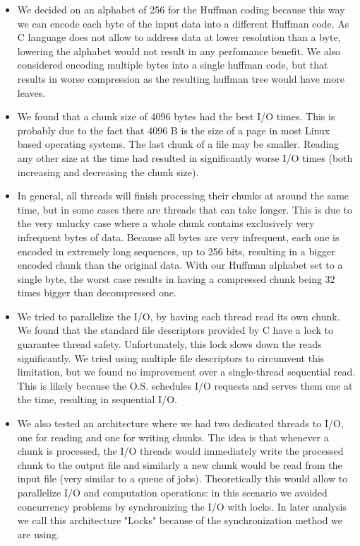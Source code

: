 \begin{itemize}
\item We decided on an alphabet of 256 for the Huffman coding because this way we can encode each byte of the input data into a different Huffman code. As C language does not allow to address data at lower resolution than a byte, lowering the alphabet would not result in any perfomance benefit. We also considered encoding multiple bytes into a single huffman code, but that results in worse compression as the resulting huffman tree would have more leaves.

\item We found that a chunk size of 4096 bytes had the best I/O times. This is probably due to the fact that 4096 B is the size of a page in most Linux based operating systems. The last chunk of a file may be smaller. Reading any other size at the time had resulted in significantly worse I/O times (both increasing and decreasing the chunk size).

\item In general, all threads will finish processing their chunks at around the same time, but in some cases there are threads that can take longer. This is due to the very unlucky case where a whole chunk contains exclusively very infrequent bytes of data. Because all bytes are very infrequent, each one is encoded in extremely long sequences, up to 256 bits, resulting in a bigger encoded chunk than the original data. With our Huffman alphabet set to a single byte, the worst case results in having a compressed chunk being 32 times bigger than decompressed one.

\item We tried to parallelize the I/O, by having each thread read its own chunk. We found that the standard file descriptors provided by C have a lock to guarantee thread safety. Unfortunately, this lock slows down the reads significantly. We tried using multiple file descriptors to circumvent this limitation, but we found no improvement over a single-thread sequential read. This is likely because the O.S. schedules I/O requests and serves them one at the time, resulting in sequential I/O.

\item We also tested an architecture where we had two dedicated threads to I/O, one for reading and one for writing chunks. The idea is that whenever a chunk is processed, the I/O threads would immediately write the processed chunk to the output file and similarly a new chunk would be read from the input file (very similar to a queue of jobs). Theoretically this would allow to parallelize I/O and computation operations: in this scenario we avoided concurrency problems by synchronizing the I/O with locks. In later analysis we call this architecture "Locks" because of the synchronization method we are using.


\end{itemize}
